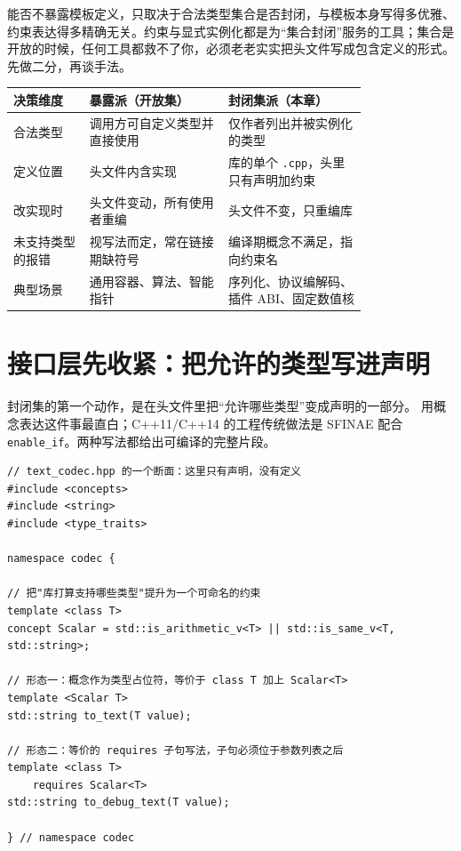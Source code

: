 \documentclass[12pt,a4paper,fontset=fandol]{ctexbook}
\newcommand{\cppxxlabel}[1]{%
  \tcbox[on line,colback=cpp20bg,colframe=cpp20bg,
    boxrule=0pt,arc=1pt,left=2pt,right=2pt,top=1pt,bottom=1pt,
    colupper=white,fontupper=\scriptsize\bfseries]{#1}}
\newcommand{\cpp}[1]{C++#1}
\newcommand{\kw}[1]{\texttt{#1}}
\begin{document}
\begin{guideline}[title={二分先于技巧}]
能否不暴露模板定义，只取决于合法类型集合是否封闭，与模板本身写得多优雅、约束表达得多精确无关。约束与显式实例化都是为“集合封闭”服务的工具；集合是开放的时候，任何工具都救不了你，必须老老实实把头文件写成包含定义的形式。先做二分，再谈手法。
\end{guideline}

\begin{compare}[title={暴露派与封闭集派：一次 API 决策对照}]
\begin{tabular}{@{}p{0.17\linewidth}p{0.31\linewidth}p{0.31\linewidth}@{}}
\toprule
\textbf{决策维度} & \textbf{暴露派（开放集）} & \textbf{封闭集派（本章）} \\
\midrule
合法类型 & 调用方可自定义类型并直接使用 & 仅作者列出并被实例化的类型 \\
\addlinespace
定义位置 & 头文件内含实现 & 库的单个 \kw{.cpp}，头里只有声明加约束 \\
\addlinespace
改实现时 & 头文件变动，所有使用者重编 & 头文件不变，只重编库 \\
\addlinespace
未支持类型的报错 & 视写法而定，常在链接期缺符号 & 编译期概念不满足，指向约束名 \\
\addlinespace
典型场景 & 通用容器、算法、智能指针 & 序列化、协议编解码、插件 ABI、固定数值核 \\
\bottomrule
\end{tabular}
\end{compare}

\section{接口层先收紧：把允许的类型写进声明}

封闭集的第一个动作，是在头文件里把“允许哪些类型”变成声明的一部分。\cppxxlabel{C++20} 用概念表达这件事最直白；\cpp{11}/\cpp{14} 的工程传统做法是 SFINAE 配合 \kw{enable\_if}。两种写法都给出可编译的完整片段。

\begin{lstlisting}[style=cppstyle,caption={概念版：把类型集合写进声明（C++20）}]
// text_codec.hpp 的一个断面：这里只有声明，没有定义
#include <concepts>
#include <string>
#include <type_traits>

namespace codec {

// 把"库打算支持哪些类型"提升为一个可命名的约束
template <class T>
concept Scalar = std::is_arithmetic_v<T> || std::is_same_v<T, std::string>;

// 形态一：概念作为类型占位符，等价于 class T 加上 Scalar<T>
template <Scalar T>
std::string to_text(T value);

// 形态二：等价的 requires 子句写法，子句必须位于参数列表之后
template <class T>
    requires Scalar<T>
std::string to_debug_text(T value);

} // namespace codec
\end{lstlisting}
\end{document}
